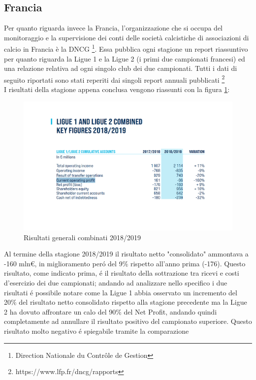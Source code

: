 \documentclass[
    corpo=12pt,
    oneside,
    evenboxes,
    tipotesi=triennale,
    stile=classica,
    oldstyle,
    autoretitolo,
    greek,
]{toptesi}
\begin{document}
\begin{interlinea}{1.5}
\subsection{Francia}
Per quanto riguarda invece la Francia, l'organizzazione che si occupa del monitoraggio e la supervisione dei conti 
delle società calcistiche di associazioni di calcio in Francia è la DNCG \footnote{Direction Nationale du Contrôle de Gestion}. Essa 
pubblica ogni stagione un report riassuntivo per quanto riguarda la Ligue 1 e la Ligue 2 (i primi due campionati francesi) ed una
relazione relativa ad ogni singolo club dei due campionati. Tutti i dati di seguito riportati sono stati reperiti dai singoli
report annuali pubblicati \footnote{https://www.lfp.fr/dncg/rapports} \\
I risultati della stagione appena conclusa vengono riassunti con la figura \ref{ris_generali_2019}:
\begin{figure}
    \centering
    \includegraphics[scale=.5]{img/ris_generali_2019}
    \caption{Risultati generali combinati 2018/2019}
    \label{ris_generali_2019}
\end{figure}
Al termine della stagione 2018/2019 il risultato netto "consolidato" ammontava a -160 mln€, in miglioramento per\'o del 9\% rispetto 
all'anno prima (-176). Questo risultato, come indicato prima, \'e il risultato della sottrazione tra ricevi e costi d'esercizio
dei due campionati; andando ad analizzare 
nello specifico i due risultati \'e possibile notare come la Ligue 1 abbia osservato un incremento del 20\% del risultato netto
consolidato rispetto alla stagione precedente ma la Ligue 2 ha dovuto affrontare un calo del 90\% del Net Profit, andando quindi completamente
ad annullare il risultato positivo del campionato superiore. Questo risultato molto negativo \'e spiegabile tramite la comparazione 

\end{interlinea}
\end{document}
